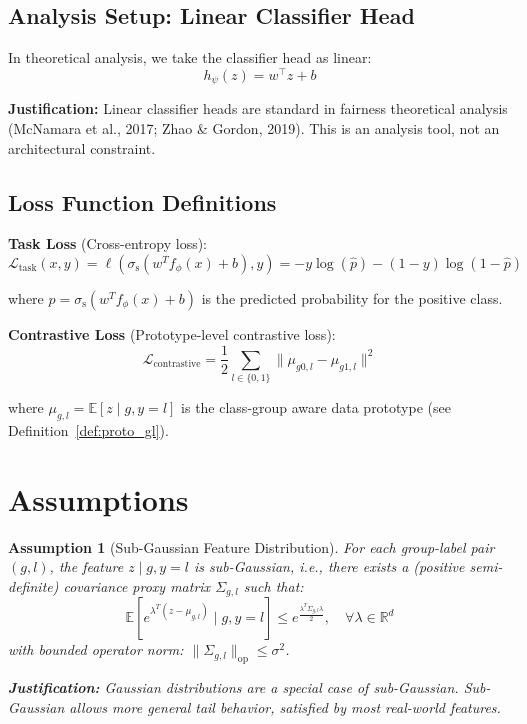 \documentclass[11pt]{article}
\newtheorem{assumption}{Assumption}
\begin{document}
\subsection{Analysis Setup: Linear Classifier Head}

In theoretical analysis, we take the classifier head as linear:
$$h_\psi(z) = w^\top z + b$$

\textbf{Justification:} Linear classifier heads are standard in fairness theoretical analysis (McNamara et al., 2017; Zhao & Gordon, 2019). This is an analysis tool, not an architectural constraint.

\subsection{Loss Function Definitions}

\textbf{Task Loss} (Cross-entropy loss):
$$\mathcal{L}_{\mathrm{task}}(x, y) = \ell(\sigma_{\text{s}}(w^T f_\phi(x) + b), y) = -y \log(\hat{p}) - (1-y) \log(1-\hat{p})$$

where $\hat{p} = \sigma_{\text{s}}(w^T f_\phi(x) + b)$ is the predicted probability for the positive class.

\textbf{Contrastive Loss} (Prototype-level contrastive loss):
$$\mathcal{L}_{\mathrm{contrastive}} = \frac{1}{2} \sum_{l \in \{0,1\}} \|\mu_{g0,l} - \mu_{g1,l}\|^2$$

where $\mu_{g,l} = \mathbb{E}[z \mid g, y=l]$ is the class-group aware data prototype (see Definition~\ref{def:proto_gl}).

\section{Assumptions}

\begin{assumption}[Sub-Gaussian Feature Distribution]
\label{ass:subgaussian}
For each group-label pair $(g, l)$, the feature $z \mid g, y=l$ is sub-Gaussian, i.e., there exists a (positive semi-definite) covariance proxy matrix $\Sigma_{g,l}$ such that:
$$\mathbb{E}\left[e^{\lambda^T (z - \mu_{g,l})} \mid g, y=l\right] \leq e^{\frac{\lambda^T \Sigma_{g,l} \lambda}{2}}, \quad \forall \lambda \in \mathbb{R}^d$$
with bounded operator norm: $\|\Sigma_{g,l}\|_{\mathrm{op}} \leq \sigma^2$.

\textbf{Justification:} Gaussian distributions are a special case of sub-Gaussian. Sub-Gaussian allows more general tail behavior, satisfied by most real-world features.
\end{assumption}
\end{document}
